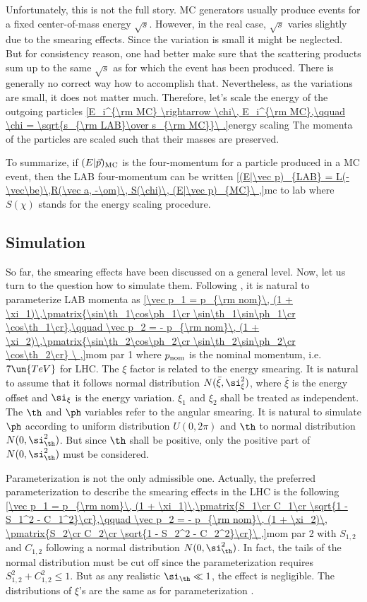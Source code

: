 Unfortunately, this is not the full story. MC generators usually produce events for a fixed center-of-mass energy $\sqrt{s}$. However, in the real case, $\sqrt{s}$ varies slightly due to the smearing effects. Since the variation is small it might be neglected. But for consistency reason, one had better make sure that the scattering products sum up to the same $\sqrt{s}$ as for which the event has been produced. There is generally no correct way how to accomplish that. Nevertheless, as the variations are small, it does not matter much. Therefore, let's scale the energy of the outgoing particles
\eqref{E_i^{\rm MC} \rightarrow \chi\, E_i^{\rm MC},\qquad \chi = \sqrt{s_{\rm LAB}\over s_{\rm MC}}\ .}{energy scaling}
The momenta of the particles are scaled such that their masses are preserved.

To summarize, if $(E|\vec p)_{\rm MC}$ is the four-momentum for a particle produced in a MC event, then the LAB four-momentum can be written
\eqref{(E|\vec p)_{LAB} = L(-\vec\be)\,R(\vec a, -\om)\, S(\chi)\, (E|\vec p)_{MC}\ ,}{mc to lab}
where $S(\chi)$ stands for the energy scaling procedure.


\subsection{Simulation}

So far, the smearing effects have been discussed on a general level. Now, let us turn to the question how to simulate them. Following , it is natural to parameterize LAB momenta as
\eqref{\vec p_1 = p_{\rm nom}\, (1 + \xi_1)\,\pmatrix{\sin\th_1\cos\ph_1\cr \sin\th_1\sin\ph_1\cr \cos\th_1\cr},\qquad \vec p_2 = - p_{\rm nom}\, (1 + \xi_2)\,\pmatrix{\sin\th_2\cos\ph_2\cr \sin\th_2\sin\ph_2\cr \cos\th_2\cr} \ ,}{mom par 1}
where $p_{\rm nom}$ is the nominal momentum, i.e. $7\un{TeV}$ for LHC. The $\xi$ factor is related to the energy smearing. It is natural to assume that it follows normal distribution $N(\bar\xi, \si_\xi^2)$, where $\bar\xi$ is the energy offset and $\si_\xi$ is the energy variation. $\xi_1$ and $\xi_2$ shall be treated as independent. The $\th$ and $\ph$ variables refer to the angular smearing. It is natural to simulate $\ph$ according to uniform distribution $U(0, 2\pi)$ and $\th$ to normal distribution $N(0, \si_\th^2)$. But since $\th$ shall be positive, only the positive part of $N(0, \si_\th^2)$ must be considered. 

Parameterization  is not the only admissible one. Actually, the preferred parameterization to describe the smearing effects in the LHC is the following
\eqref{\vec p_1 = p_{\rm nom}\, (1 + \xi_1)\,\pmatrix{S_1\cr C_1\cr \sqrt{1 - S_1^2 - C_1^2}\cr},\qquad \vec p_2 = - p_{\rm nom}\, (1 + \xi_2)\, \pmatrix{S_2\cr C_2\cr \sqrt{1 - S_2^2 - C_2^2}\cr}\ ,}{mom par 2}
with $S_{1,2}$ and $C_{1,2}$ following a normal distribution $N(0, \si_\th^2)$. In fact, the tails of the normal distribution must be cut off since the parameterization requires $S_{1,2}^2 + C_{1,2}^2 \leq 1$. But as any realistic $\si_\th \ll 1$, the effect is negligible. The distributions of $\xi$'s are the same as for parameterization .

